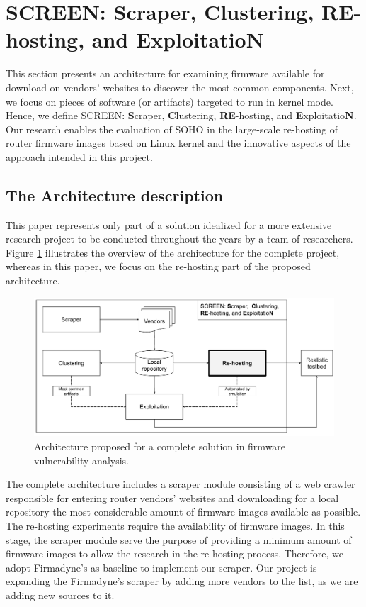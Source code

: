 \documentclass[12pt]{article}
\begin{document}
\section{SCREEN: {\bf S}craper, {\bf C}lustering, {\bf RE}-hosting, and {\bf E}xploitatio{\bf N}}
\label{sec:methodology}

This section presents an architecture for examining firmware available for download on vendors' websites to discover the most common components. Next, we focus on pieces of software (or artifacts) targeted to run in kernel mode.  Hence, we define SCREEN: {\bf S}craper, {\bf C}lustering, {\bf RE}-hosting, and {\bf E}xploitatio{\bf N}.  Our research enables the evaluation of SOHO in the large-scale re-hosting of router firmware images based on Linux kernel and the innovative aspects of the approach intended in this project.


\subsection{The Architecture description}
This paper represents only part of a solution idealized for a more extensive research project to be conducted throughout the years by a team of researchers. Figure \ref{fig:architecture} illustrates the overview of the architecture for the complete project, whereas in this paper, we focus on the re-hosting part of the proposed architecture.

\begin{figure}[h]
    \centering
    \includegraphics[width=\textwidth]{sebseg/screen}
    \caption{Architecture proposed for a complete solution in firmware vulnerability analysis.}
    \label{fig:architecture}
\end{figure}

The complete architecture includes a scraper module consisting of a web crawler responsible for entering router vendors' websites and downloading for a local repository the most considerable amount of firmware images available as possible. The re-hosting experiments require the availability of firmware images. In this stage, the scraper module serve the purpose of providing a minimum amount of firmware images to allow the research in the re-hosting process. Therefore, we adopt Firmadyne's \cite{firmadyne} as baseline to implement our scraper.  Our project is expanding the Firmadyne's scraper by adding more vendors to the list, as we are adding new sources to it.
\end{document}
